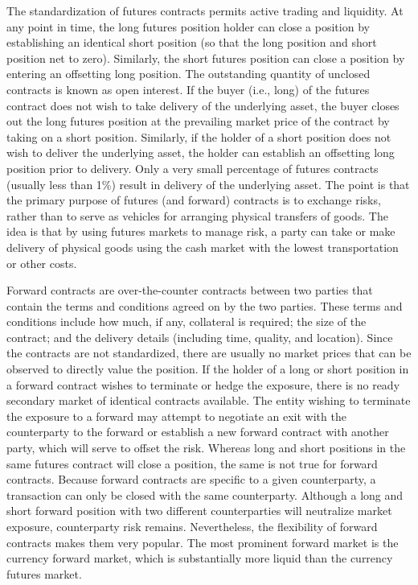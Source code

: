 \documentclass[11pt]{article}
\begin{document}
The standardization of futures contracts permits active trading and liquidity. At any point in time, the long futures position holder can close a position by establishing an identical short position (so that the long position and short position net to zero). Similarly, the short futures position can close a position by entering an offsetting long position. The outstanding quantity of unclosed contracts is known as open interest. If the buyer (i.e., long) of the futures contract does not wish to take delivery of the underlying asset, the buyer closes out the long futures position at the prevailing market price of the contract by taking on a short position. Similarly, if the holder of a short position does not wish to deliver the underlying asset, the holder can establish an offsetting long position prior to delivery. Only a very small percentage of futures contracts (usually less than 1\%) result in delivery of the underlying asset. The point is that the primary purpose of futures (and forward) contracts is to exchange risks, rather than to serve as vehicles for arranging physical transfers of goods. The idea is that by using futures markets to manage risk, a party can take or make delivery of physical goods using the cash market with the lowest transportation or other costs.

Forward contracts are over-the-counter contracts between two parties that contain the terms and conditions agreed on by the two parties. These terms and conditions include how much, if any, collateral is required; the size of the contract; and the delivery details (including time, quality, and location). Since the contracts are not standardized, there are usually no market prices that can be observed to directly value the position. If the holder of a long or short position in a forward contract wishes to terminate or hedge the exposure, there is no ready secondary market of identical contracts available. The entity wishing to terminate the exposure to a forward may attempt to negotiate an exit with the counterparty to the forward or establish a new forward contract with another party, which will serve to offset the risk. Whereas long and short positions in the same futures contract will close a position, the same is not true for forward contracts. Because forward contracts are specific to a given counterparty, a transaction can only be closed with the same counterparty. Although a long and short forward position with two different counterparties will neutralize market exposure, counterparty risk remains. Nevertheless, the flexibility of forward contracts makes them very popular. The most prominent forward market is the currency forward market, which is substantially more liquid than the currency futures market.
\end{document}
